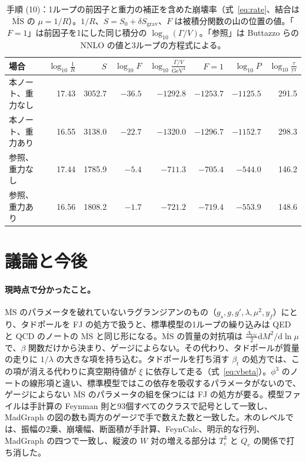 \documentclass[a4paper,10pt]{ltjsarticle}
\newcommand{\dd}{\mathrm{d}}
\newcommand{\MSbar}{\overline{\mathrm{MS}}}
\newcommand{\DUV}{\Delta_{\mathrm{UV}}}
\begin{document}
\begin{table}[tbp]
\centering\footnotesize
\caption{手順 (10)：1ループの前因子と重力の補正を含めた崩壊率（式~\eqref{eq:rate}、結合は $\MSbar$ の $\mu=1/R$）。$1/R$、$S=S_0+\delta S_{\mathrm{grav}}$、$F$ は被積分関数の山の位置の値。「$F=1$」は前因子を1にした同じ積分の $\log_{10}(\Gamma/V)$。「参照」は Buttazzo らの NNLO の値と3ループの方程式による。}
\label{tab:prefactor}
\begin{tabularx}{\linewidth}{>{\raggedright\arraybackslash}Xrrrrrrr}
\toprule
場合 & $\log_{10}\frac1R$ & $S$ & $\log_{10}F$ & $\log_{10}\frac{\Gamma/V}{\mathrm{GeV}^4}$ & $F=1$ & $\log_{10}P$ & $\log_{10}\frac\tau{\mathrm{yr}}$ \\
\midrule
本ノート、重力なし & 17.43 & 3052.7 & $-36.5$ & $-1292.8$ & $-1253.7$ & $-1125.5$ & 291.5 \\
本ノート、重力あり & 16.55 & 3138.0 & $-22.7$ & $-1320.0$ & $-1296.7$ & $-1152.7$ & 298.3 \\
参照、重力なし & 17.44 & 1785.9 & $-5.4$ & $-711.3$ & $-705.4$ & $-544.0$ & 146.2 \\
参照、重力あり & 16.56 & 1808.2 & $-1.7$ & $-721.2$ & $-719.4$ & $-553.9$ & 148.6 \\
\bottomrule
\end{tabularx}
\end{table}

\section{議論と今後}\label{sec:discussion}

\paragraph{現時点で分かったこと。}$\MSbar$ のパラメータを破れていないラグランジアンのもの（$g_s,g,g',\lambda,\mu^2,y_f$）にとり、タドポールを FJ の処方で扱うと、標準模型の1ループの繰り込みは QED と QCD のノートの $\MSbar$ と同じ形になる。$\MSbar$ の質量の対抗項は $\frac{\DUV}2\dd M^2/\dd\ln\mu$ で、$\beta$ 関数だけから決まり、ゲージによらない。その代わり、タドポールが質量の走りに $1/\lambda$ の大きな項を持ち込む。タドポールを打ち消す $\beta_t$ の処方では、この項が消える代わりに真空期待値が $\xi$ に依存して走る（式~\eqref{eq:vbeta}）。$\phi^3$ のノートの線形項と違い、標準模型ではこの依存を吸収するパラメータがないので、ゲージによらない $\MSbar$ のパラメータの組を保つには FJ の処方が要る。模型ファイルは手計算の Feynman 則と93個すべてのクラスで記号として一致し、MadGraph の図の数も両方のゲージで手で数えた数と一致した。木のレベルでは、振幅の2乗、崩壊幅、断面積が手計算、FeynCalc、明示的な行列、MadGraph の四つで一致し、縦波の $W$ 対の増える部分は $T^3_e$ と $Q_e$ の関係で打ち消した。
\end{document}
